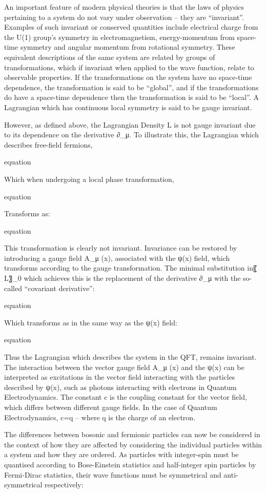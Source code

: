 An important feature of modern physical theories is that the laws of physics pertaining to a system do not vary under observation – they are “invariant”. 
Examples of such invariant or conserved quantities include electrical charge from the U(1) group’s symmetry in electromagnetism, energy-momentum from space-time symmetry and angular momentum from rotational symmetry. 
These equivalent descriptions of the same system are related by groups of transformations, which if invariant when applied to the wave function, relate to observable properties. 
If the transformations on the system have no space-time dependence, the transformation is said to be “global”, and if the transformations do have a space-time dependence then the transformation is said to be “local”. 
A Lagrangian which has continuous local symmetry is said to be gauge invariant. 

However, as defined above, the Lagrangian Density L is not gauge invariant due to its dependence on the derivative ∂_μ. To illustrate this, the Lagrangian which describes free-field fermions, 

equation

Which when undergoing a local phase transformation,

equation

Transforms as:

equation

This transformation is clearly not invariant. Invariance can be restored by introducing a gauge field A_μ (x), associated with the ψ(x) field, which transforms according to the gauge transformation. 
The minimal substitution in〖 L〗_0 which achieves this is the replacement of the derivative ∂_μ  with the so-called “covariant derivative”:

equation

Which transforms as in the same way as the ψ(x) field:

equation

Thus the Lagrangian which describes the system in the QFT, remains invariant. 
The interaction between the vector gauge field A_μ (x) and the ψ(x) can be interpreted as excitations in the vector field interacting with the particles described by ψ(x), such as photons interacting with electrons in Quantum Electrodynamics. 
The constant c is the coupling constant for the vector field, which differs between different gauge fields. 
In the case of Quantum Electrodynamics, c=q – where q is the charge of an electron.

The differences between bosonic and fermionic particles can now be considered in the context of how they are affected by considering the individual particles within a system and how they are ordered. 
As particles with integer-spin must be quantised according to Bose-Einstein statistics and half-integer spin particles by Fermi-Dirac statistics, their wave functions must be symmetrical and anti-symmetrical respectively:

